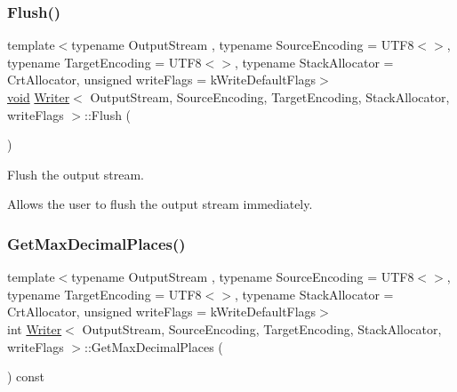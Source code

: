 \subsubsection{\texorpdfstring{Flush()}{Flush()}}
{\footnotesize\ttfamily template$<$typename Output\+Stream , typename Source\+Encoding  = U\+T\+F8$<$$>$, typename Target\+Encoding  = U\+T\+F8$<$$>$, typename Stack\+Allocator  = Crt\+Allocator, unsigned write\+Flags = k\+Write\+Default\+Flags$>$ \\
\hyperlink{imgui__impl__opengl3__loader_8h_ac668e7cffd9e2e9cfee428b9b2f34fa7}{void} \hyperlink{classWriter}{Writer}$<$ Output\+Stream, Source\+Encoding, Target\+Encoding, Stack\+Allocator, write\+Flags $>$\+::Flush (\begin{DoxyParamCaption}{ }\end{DoxyParamCaption})\hspace{0.3cm}{\ttfamily [inline]}}



Flush the output stream. 

Allows the user to flush the output stream immediately. \mbox{\label{classWriter_ad35ddb56c6969d9584bf1e73bebda5ab}} 
\subsubsection{\texorpdfstring{Get\+Max\+Decimal\+Places()}{GetMaxDecimalPlaces()}}
{\footnotesize\ttfamily template$<$typename Output\+Stream , typename Source\+Encoding  = U\+T\+F8$<$$>$, typename Target\+Encoding  = U\+T\+F8$<$$>$, typename Stack\+Allocator  = Crt\+Allocator, unsigned write\+Flags = k\+Write\+Default\+Flags$>$ \\
int \hyperlink{classWriter}{Writer}$<$ Output\+Stream, Source\+Encoding, Target\+Encoding, Stack\+Allocator, write\+Flags $>$\+::Get\+Max\+Decimal\+Places (\begin{DoxyParamCaption}{ }\end{DoxyParamCaption}) const\hspace{0.3cm}{\ttfamily [inline]}}

\mbox{\label{classWriter_ad471415aa7741e732bab0bcfbb9522a8}} 
